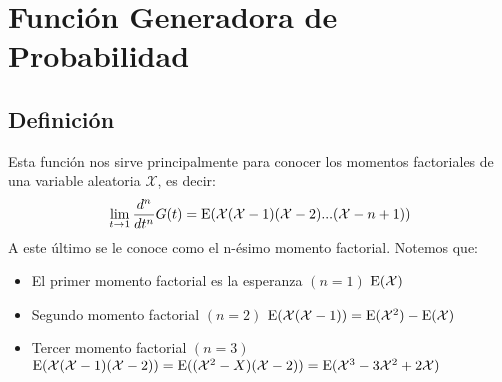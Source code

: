 \section{Función Generadora de Probabilidad}
\subsection{Definición}


Esta función nos sirve principalmente para conocer los momentos factoriales de una variable aleatoria $\mathcal X$, es decir:
  \[
  \lim_{t \to 1} \frac{d^n}{dt^n}G(t) = \operatorname{E}(\mathcal X(\mathcal X-1)(\mathcal X-2)...(\mathcal X-n+1))
\]
A este último se le conoce como el n-ésimo momento factorial. Notemos que:
\begin{itemize}
    \item El primer momento factorial es la esperanza $(n=1)$ $\operatorname{E}(\mathcal X)$
    \item Segundo momento factorial $(n=2)$ $\operatorname{E}(\mathcal X(\mathcal X-1))=\operatorname{E}(\mathcal X^2)-\operatorname{E}(\mathcal X)$
    \item Tercer momento factorial $(n=3)$ $\operatorname{E}(\mathcal X(\mathcal X-1)(\mathcal X-2))=\operatorname{E}((\mathcal X^2-X)(\mathcal X-2))=\operatorname{E}(\mathcal X^3-3\mathcal X^2+2\mathcal X)$
\end{itemize}

